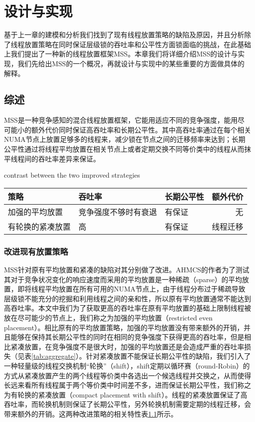 \chapter{设计与实现}
\label{chap:faq}
基于上一章的建模和分析我们找到了现有线程放置策略的缺陷及原因，并且分析除了线程放置策略在同时保证层级锁的吞吐率和公平性方面锁面临的挑战，在此基础上我们提出了一种新的线程放置框架MSS。本章我们将详细介绍MSS的设计与实现，我们先给出MSS的一个概况，再就设计与实现中的某些重要的方面做具体的解释。

\section{综述}
MSS是一种竞争感知的混合线程放置框架，它能用适应不同的竞争强度，能用尽可能小的额外代价同时保证高吞吐率和长期公平性。其中高吞吐率通过在每个相关NUMA节点上放置足够多的线程来，减少锁在节点之间的迁移频率来达到；长期公平性通过将线程平均放置在相关节点上或者定期交换不同等价类中的线程从而抹平线程间的吞吐率差异来保证。

\begin{table}[!hpb]
  \centering
    {contrast between the two improved strategies}
  \label{tab:contrast}
  \begin{tabular}{@{}lllr@{}} \toprule
    策略             & 吞吐率 & 长期公平性 & 额外代价 \\ \midrule
    加强的平均放置   & 竞争强度不够时有衰退 & 有保证  & 无\\
    有轮换的紧凑放置 & 高 & 有保证  & 线程迁移\\
  \end{tabular}
\end{table}

\subsection{改进现有放置策略}
MSS针对原有平均放置和紧凑的缺陷对其分别做了改进。AHMCS的作者为了测试其对于竞争状况变化的响应速度而采用的平均放置是一种稀疏（sparse）的平均放置，即将线程平均放置在所有可用的NUMA节点上，由于线程分布过于稀疏导致层级锁不能充分的挖掘和利用线程之间的亲和性，所以原有平均放置通常不能达到高吞吐率。本文中我们为了获取更高的吞吐率在原有平均放置的基础上限制线程被放在尽可能少的节点上，我们称之为加强的平均放置（restricted even placement）。相比原有的平均放置策略，加强的平均放置没有带来额外的开销，并且能够在保持其长期公平性的同时在相同的竞争强度下获得更高的吞吐率，但是相比紧凑放置，在竞争强度不是很大时，加强的平均放置还是会造成严重的吞吐率损失（见表\ref{tab:aggregate}）。针对紧凑放置不能保证长期公平性的缺陷，我们引入了一种轻量级的线程交换机制“轮换”（shift），shift定期以循环赛（round-Robin）的方式从紧凑放置产生的两个线程等价类中各选出一个候选线程并交换之，从而使得长远来看所有线程属于两个等价类中时间差不多，进而保证长期公平性，我们称之为有轮换的紧凑放置（compact placement with shift）。线程的紧凑放置保证了高吞吐率，而轮换机制则保证了长期公平性，另外轮换机制需要定期的线程迁移，会带来额外的开销。这两种改进策略的相关特性表\ref{tab:contrast}所示。

